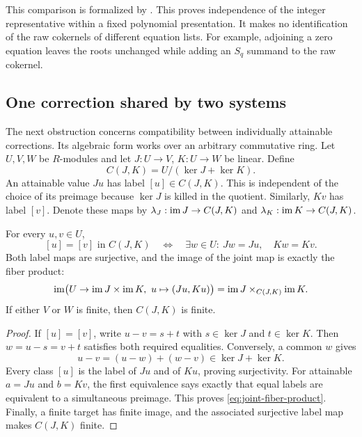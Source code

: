 This comparison is formalized by
.
This proves independence of the integer representative within a fixed
polynomial presentation. It makes no identification of the raw cokernels
of different equation lists. For example, adjoining a zero equation leaves
the roots unchanged while adding an $S_q$ summand to the raw cokernel.

\subsection{One correction shared by two systems}

The next obstruction concerns compatibility between individually attainable
corrections. Its algebraic form works over an arbitrary commutative ring.
Let $U,V,W$ be $R$-modules and let $J:U\to V$, $K:U\to W$ be linear.
Define
\begin{equation}\label{eq:common-quotient}
 C(J,K)=U/(\ker J+\ker K).
\end{equation}
An attainable value $Ju$ has label $[u]\in C(J,K)$. This is independent of
the choice of its preimage because $\ker J$ is killed in the quotient.
Similarly, $Kv$ has label $[v]$. Denote these maps by
$\lambda_J:\operatorname{im} J\to C(J,K)$ and $\lambda_K:\operatorname{im} K\to C(J,K)$.

\begin{theorem}\label{thm:common-correction}
For every $u,v\in U$,
\begin{equation}\label{eq:common-correction}
 [u]=[v]\text{ in }C(J,K)
 \quad\Longleftrightarrow\quad
 \exists w\in U:\ Jw=Ju,\quad Kw=Kv.
\end{equation}
Both label maps are surjective, and the image of the joint map is exactly
the fiber product:
\begin{equation}\label{eq:joint-fiber-product}
 \operatorname{im}\bigl(U\to\operatorname{im} J\times\operatorname{im} K,\ u\mapsto(Ju,Ku)\bigr)
 =\operatorname{im} J\mathbin{\times}_{C(J,K)}\operatorname{im} K.
\end{equation}
If either $V$ or $W$ is finite, then $C(J,K)$ is finite.
\end{theorem}

\begin{proof}
If $[u]=[v]$, write $u-v=s+t$ with $s\in\ker J$ and $t\in\ker K$.
Then $w=u-s=v+t$ satisfies both required equalities. Conversely, a common
$w$ gives
\[
 u-v=(u-w)+(w-v)\in\ker J+\ker K.
\]
Every class $[u]$ is the label of $Ju$ and of $Ku$, proving surjectivity.
For attainable $a=Ju$ and $b=Kv$, the first equivalence says exactly that
equal labels are equivalent to a simultaneous preimage. This proves
\eqref{eq:joint-fiber-product}. Finally, a finite target has finite image,
and the associated surjective label map makes $C(J,K)$ finite.
\end{proof}

